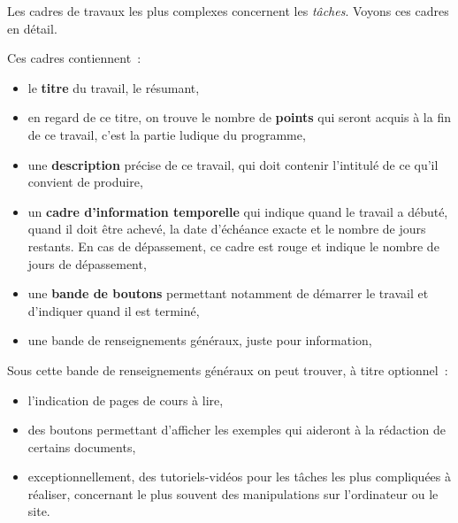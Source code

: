 Les cadres de travaux les plus complexes concernent les \emph{tâches}. Voyons ces cadres en détail.


Ces cadres contiennent~{}:

\begin{itemize}
\item le \textbf{titre} du travail, le résumant,
\item en regard de ce titre, on trouve le nombre de \textbf{points} qui seront acquis à la fin de ce travail, c'est la partie ludique du programme,
\item une \textbf{description} précise de ce travail, qui doit contenir l'intitulé de ce qu'il convient de produire,
\item un \textbf{cadre d'information temporelle} qui indique quand le travail a débuté, quand il doit être achevé, la date d'échéance exacte et le nombre de jours restants. En cas de dépassement, ce cadre est rouge et indique le nombre de jours de dépassement,
\item une \textbf{bande de boutons} permettant notamment de démarrer le travail et d'indiquer quand il est terminé,
\item une bande de renseignements généraux, juste pour information,
\end{itemize}

Sous cette bande de renseignements généraux on peut trouver, à titre optionnel~{}:

\begin{itemize}
\item l'indication de pages de cours à lire,
\item des boutons permettant d'afficher les exemples qui aideront à la rédaction de certains documents,
\item exceptionnellement, des tutoriels-vidéos pour les tâches les plus compliquées à réaliser, concernant le plus souvent des manipulations sur l'ordinateur ou le site.
\end{itemize}
